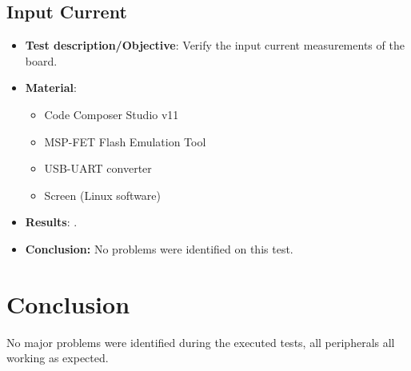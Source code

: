 \subsection{Input Current}

\begin{itemize}
    \item \textbf{Test description/Objective}: Verify the input current measurements of the board.
    \item \textbf{Material}:
        \begin{itemize}
            \item Code Composer Studio v11
            \item MSP-FET Flash Emulation Tool
            \item USB-UART converter
            \item Screen (Linux software)
        \end{itemize}
    \item \textbf{Results}: .
    \item \textbf{Conclusion:} No problems were identified on this test.
\end{itemize}

\section{Conclusion}

No major problems were identified during the executed tests, all peripherals all working as expected.